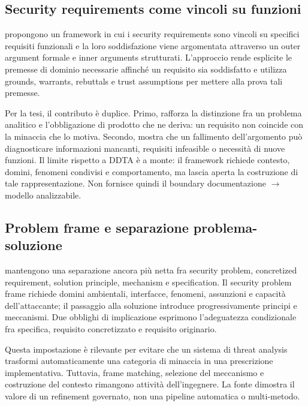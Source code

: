 \documentclass[12pt,a4paper,oneside]{report}
\begin{document}
\subsection{Security requirements come vincoli su funzioni}

\citet{haley2008securityrequirements} propongono un framework in cui i security requirements sono vincoli su specifici requisiti funzionali e la loro soddisfazione viene argomentata attraverso un outer argument formale e inner arguments strutturati. L'approccio rende esplicite le premesse di dominio necessarie affinché un requisito sia soddisfatto e utilizza grounds, warrants, rebuttals e trust assumptions per mettere alla prova tali premesse.

Per la tesi, il contributo è duplice. Primo, rafforza la distinzione fra un problema analitico e l'obbligazione di prodotto che ne deriva: un requisito non coincide con la minaccia che lo motiva. Secondo, mostra che un fallimento dell'argomento può diagnosticare informazioni mancanti, requisiti infeasible o necessità di nuove funzioni. Il limite rispetto a DDTA è a monte: il framework richiede contesto, domini, fenomeni condivisi e comportamento, ma lascia aperta la costruzione di tale rappresentazione. Non fornisce quindi il boundary documentazione $\rightarrow$ modello analizzabile.

\subsection{Problem frame e separazione problema-soluzione}

\citet{hatebur2006securityengineering} mantengono una separazione ancora più netta fra security problem, concretized requirement, solution principle, mechanism e specification. Il security problem frame richiede domini ambientali, interfacce, fenomeni, assunzioni e capacità dell'attaccante; il passaggio alla soluzione introduce progressivamente principi e meccanismi. Due obblighi di implicazione esprimono l'adeguatezza condizionale fra specifica, requisito concretizzato e requisito originario.

Questa impostazione è rilevante per evitare che un sistema di threat analysis trasformi automaticamente una categoria di minaccia in una prescrizione implementativa. Tuttavia, frame matching, selezione del meccanismo e costruzione del contesto rimangono attività dell'ingegnere. La fonte dimostra il valore di un refinement governato, non una pipeline automatica o multi-metodo.
\end{document}
